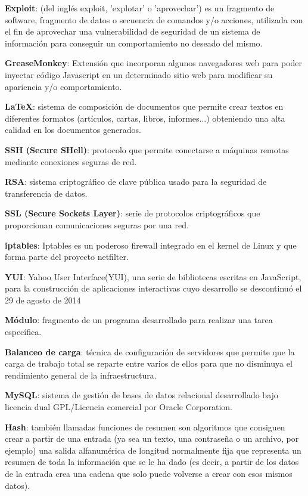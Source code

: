 \textbf{Exploit}: (del inglés exploit, 'explotar' o 'aprovechar') es un fragmento de software, fragmento de datos o secuencia de comandos y/o acciones, utilizada con el fin de aprovechar una vulnerabilidad de seguridad de un sistema de información para conseguir un comportamiento no deseado del mismo.
\bigskip

\textbf{GreaseMonkey}: Extensión que incorporan algunos navegadores web para poder inyectar código Javascript en un determinado sitio web para modificar su apariencia y/o comportamiento.
\bigskip

\textbf{LaTeX}: sistema de composición de documentos que permite crear textos en diferentes formatos (artículos, cartas, libros, informes...) obteniendo una alta calidad en los documentos generados.
\bigskip


\textbf{SSH (Secure SHell)}: protocolo que permite conectarse a máquinas remotas mediante conexiones seguras de red.
\bigskip

\textbf{RSA}: sistema criptográfico de clave pública usado para la seguridad de transferencia de datos.
\bigskip

\textbf{SSL (Secure Sockets Layer)}: serie de protocolos criptográficos que proporcionan comunicaciones seguras por una red.
\bigskip


\textbf{iptables}: Iptables es un poderoso firewall integrado en el kernel de Linux y que forma parte del proyecto netfilter.
\bigskip





\textbf{YUI}: Yahoo User Interface(YUI), una serie de bibliotecas escritas en JavaScript, para la construcción de aplicaciones interactivas cuyo desarrollo se descontinuó el 29 de agosto de 2014



\textbf{Módulo}: fragmento de un programa desarrollado para realizar una tarea específica.
\bigskip

\textbf{Balanceo de carga}: técnica de configuración de servidores que permite que la carga de trabajo total se reparte entre varios de ellos para que no disminuya el rendimiento general de la infraestructura.
\bigskip


\textbf{MySQL}: sistema de gestión de bases de datos relacional desarrollado bajo licencia dual GPL/Licencia comercial por Oracle Corporation.
\bigskip

\textbf{Hash}: también llamadas funciones de resumen son algoritmos que consiguen crear a partir de una entrada (ya sea un texto, una contraseña o un archivo, por ejemplo) una salida alfanumérica de longitud normalmente fija que representa un resumen de toda la información que se le ha dado (es decir, a partir de los datos de la entrada crea una cadena que solo puede volverse a crear con esos mismos datos).
\bigskip

